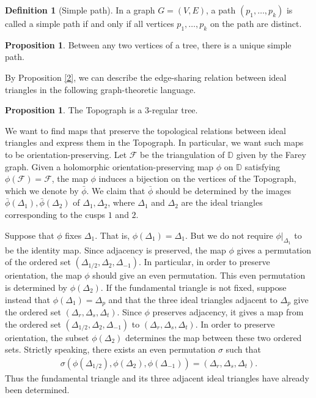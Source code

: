 \documentclass[10pt, a4paper]{article}
\newcommand{\D}{\mathbb{D}}
\theoremstyle{definition}
\newtheorem{proposition}[theorem]{Proposition}
\newtheorem{definition}[theorem]{Definition}
\theoremstyle{remark}
\begin{document}
\begin{definition}[Simple path]
    In a graph \(G = (V, E)\), a path \((p_1, \dots, p_k)\) is called a simple path if and only if all vertices \(p_1, \dots, p_k\) on the path are distinct.
\end{definition}

\begin{proposition}
    Between any two vertices of a tree, there is a unique simple path.
\end{proposition}

By Proposition {\ref{2}}, we can describe the edge-sharing relation between ideal triangles in the following graph-theoretic language.

\begin{proposition}
    The Topograph is a \(3\)-regular tree.
\end{proposition}

We want to find maps that preserve the topological relations between ideal triangles and express them in the Topograph. In particular, we want such maps to be orientation-preserving.
Let \(\mathcal{F}\) be the triangulation of \(\D\) given by the Farey graph.
Given a holomorphic orientation-preserving map \(\phi\) on \(\D\) satisfying \(\phi(\mathcal{F})= \mathcal{F}\), the map \(\phi\) induces a bijection on the vertices of the Topograph, which we denote by \(\bar{\phi}\).
We claim that \(\bar{\phi}\) should be determined by the images \(\bar{\phi}(\Delta_{1}),\bar{\phi}(\Delta_{2})\) of \(\Delta_1,\Delta_2\), where \(\Delta_1\) and \(\Delta_2\) are the ideal triangles corresponding to the cusps \(1\) and \(2\).

Suppose that \(\phi\) fixes \(\Delta_1\). That is, \(\phi(\Delta_1) = \Delta_1. \) But we do not require \(\phi|_{\Delta_1}\) to be the identity map.
Since adjacency is preserved, the map \(\phi\) gives a permutation of the ordered set \((\Delta_{1/2},\Delta_{2},\Delta_{-1})\). In particular, in order to preserve orientation, the map \(\phi\) should give an even permutation.
This even permutation is determined by \(\phi(\Delta_2)\). If the fundamental triangle is not fixed, suppose instead that \(\phi(\Delta_1)=\Delta_p\) and that the three ideal triangles adjacent to \(\Delta_p\) give the ordered set \((\Delta_r,\Delta_s,\Delta_t)\).
Since \(\phi\) preserves adjacency, it gives a map from the ordered set \((\Delta_{1/2},\Delta_{2},\Delta_{-1})\) to \((\Delta_r,\Delta_s,\Delta_t)\). In order to preserve orientation, the subset \(\phi(\Delta_2)\) determines the map between these two ordered sets.
Strictly speaking, there exists an even permutation \(\sigma\) such that
\begin{align*}
    \sigma(\phi(\Delta_{1/2}),\phi(\Delta_{2}),\phi(\Delta_{-1})) = (\Delta_r,\Delta_s,\Delta_t). 
\end{align*} 
Thus the fundamental triangle and its three adjacent ideal triangles have already been determined.
\end{document}
